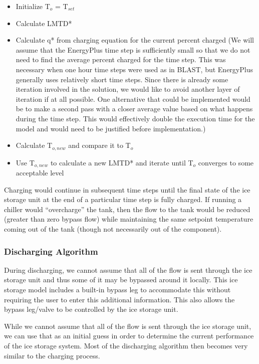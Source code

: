 \begin{itemize}
  \item
    Initialize T\(_{o}\) = T\(_{set}\)
  \item
    Calculate LMTD*
  \item
    Calculate q* from charging equation for the current percent charged (We will assume that the EnergyPlus time step is sufficiently small so that we do not need to find the average percent charged for the time step. This was necessary when one hour time steps were used as in BLAST, but EnergyPlus generally uses relatively short time steps. Since there is already some iteration involved in the solution, we would like to avoid another layer of iteration if at all possible. One alternative that could be implemented would be to make a second pass with a closer average value based on what happens during the time step. This would effectively double the execution time for the model and would need to be justified before implementation.)
  \item
    Calculate T\(_{o,new}\) and compare it to T\(_{o}\)
  \item
    Use T\(_{o,new}\) to calculate a new LMTD* and iterate until T\(_{o}\) converges to some acceptable level
\end{itemize}

Charging would continue in subsequent time steps until the final state of the ice storage unit at the end of a particular time step is fully charged. If running a chiller would ``overcharge'' the tank, then the flow to the tank would be reduced (greater than zero bypass flow) while maintaining the same setpoint temperature coming out of the tank (though not necessarily out of the component).

\subsubsection{Discharging Algorithm}\label{discharging-algorithm}

During discharging, we cannot assume that all of the flow is sent through the ice storage unit and thus some of it may be bypassed around it locally. This ice storage model includes a built-in bypass leg to accommodate this without requiring the user to enter this additional information. This also allows the bypass leg/valve to be controlled by the ice storage unit.

While we cannot assume that all of the flow is sent through the ice storage unit, we can use that as an initial guess in order to determine the current performance of the ice storage system. Most of the discharging algorithm then becomes very similar to the charging process.

